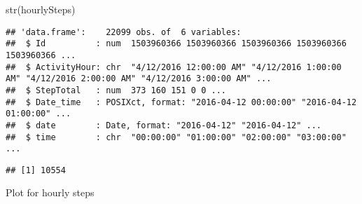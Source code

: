 \documentclass[
]{article}
\newenvironment{Shaded}{\begin{snugshade}}{\end{snugshade}}
\newcommand{\AttributeTok}[1]{\textcolor[rgb]{0.77,0.63,0.00}{#1}}
\newcommand{\FunctionTok}[1]{\textcolor[rgb]{0.00,0.00,0.00}{#1}}
\newcommand{\NormalTok}[1]{#1}
\newcommand{\OtherTok}[1]{\textcolor[rgb]{0.56,0.35,0.01}{#1}}
\newcommand{\SpecialCharTok}[1]{\textcolor[rgb]{0.00,0.00,0.00}{#1}}
\newcommand{\StringTok}[1]{\textcolor[rgb]{0.31,0.60,0.02}{#1}}
\begin{document}
\begin{Shaded}
\end{Shaded}

\begin{Shaded}
\begin{Highlighting}[]
\FunctionTok{str}\NormalTok{(hourlySteps)}
\end{Highlighting}
\end{Shaded}

\begin{verbatim}
## 'data.frame':    22099 obs. of  6 variables:
##  $ Id          : num  1503960366 1503960366 1503960366 1503960366 1503960366 ...
##  $ ActivityHour: chr  "4/12/2016 12:00:00 AM" "4/12/2016 1:00:00 AM" "4/12/2016 2:00:00 AM" "4/12/2016 3:00:00 AM" ...
##  $ StepTotal   : num  373 160 151 0 0 ...
##  $ Date_time   : POSIXct, format: "2016-04-12 00:00:00" "2016-04-12 01:00:00" ...
##  $ date        : Date, format: "2016-04-12" "2016-04-12" ...
##  $ time        : chr  "00:00:00" "01:00:00" "02:00:00" "03:00:00" ...
\end{verbatim}

\begin{Shaded}
\end{Shaded}

\begin{verbatim}
## [1] 10554
\end{verbatim}

Plot for hourly steps
\end{document}
